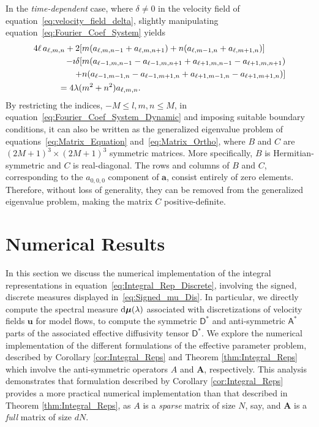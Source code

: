 \documentclass[leqno,onefignum,onetabnum]{siamltex1213}
\renewcommand{\d}{\mathrm{d}}
\newcommand{\Ab}{\mathbf{A}}
\newcommand{\Dm}{\mathsf{D}}
\newcommand{\Am}{\mathsf{A}}
\newcommand\bmu{\mbox{\boldmath${\mu}$}}
\newcommand{\veca}{\boldsymbol{a}}
\newcommand{\vecu}{\boldsymbol{u}}
\begin{document}
In the \emph{time-dependent} case, where $\delta\neq0$ in the velocity field
of equation~\eqref{eq:velocity_field_delta}, slightly manipulating
equation~\eqref{eq:Fourier_Coef_System} yields  
%
\begin{align}\label{eq:Fourier_Coef_System_Dynamic}
4\ell\,a_{\ell,m,n}
+2[&m(a_{\ell,m,n-1}+a_{\ell,m,n+1})+n(a_{\ell,m-1,n}+a_{\ell,m+1,n})]
\notag\\
-\imath\delta[&m(a_{\ell-1,m,n-1}-a_{\ell-1,m,n+1}+a_{\ell+1,m,n-1}-a_{\ell+1,m,n+1})\notag\\
    +&n(a_{\ell-1,m-1,n}-a_{\ell-1,m+1,n}+a_{\ell+1,m-1,n}-a_{\ell+1,m+1,n})] 
\notag\\
=4\lambda(&m^2+n^2)a_{\ell,m,n}.
\end{align}
%
By restricting the indices, $-M\leq l,m,n\leq M$, in
equation~\eqref{eq:Fourier_Coef_System_Dynamic} and imposing suitable
boundary  
conditions, it can also be
written as the generalized eigenvalue problem of
equations~\eqref{eq:Matrix_Equation} and~\eqref{eq:Matrix_Ortho},
where  $B$ and 
$C$ are $(2M+1)^3\times(2M+1)^3$ symmetric matrices. More specifically,
$B$ is Hermitian-symmetric and $C$ is real-diagonal. The rows and
columns of $B$ and $C$, corresponding to the $a_{0,0,0}$ component of
$\veca$, consist entirely of zero elements. Therefore, without loss
of generality, they can be removed from the generalized eigenvalue
problem, making the matrix $C$ positive-definite.  







\section{Numerical Results}\label{sec:Num_Results}
%
In this section we discuss the numerical implementation of the
integral representations in equation~\eqref{eq:Integral_Rep_Discrete},
involving the signed, discrete measures displayed
in~\eqref{eq:Signed_mu_Dis}. In particular, we directly compute the 
spectral measure $\d\bmu(\lambda)$ associated with discretizations of
velocity fields $\vecu $ for model flows, to compute the symmetric
$\Dm^*$ and anti-symmetric $\Am^*$ parts of the associated
effective diffusivity tensor $\Dm^*$. We explore the numerical
implementation of the different formulations of the effective
parameter problem, described by Corollary \ref{cor:Integral_Reps} and
Theorem \ref{thm:Integral_Reps} which involve the anti-symmetric
operators $A$ and $\Ab$, respectively. This analysis demonstrates that
formulation described by Corollary \ref{cor:Integral_Reps} provides a
more practical numerical implementation than that described in Theorem
\ref{thm:Integral_Reps}, as $A$ is a \emph{sparse} matrix of size $N$,
say, and $\Ab$ is a \emph{full} matrix of size $dN$.    
\end{document}

